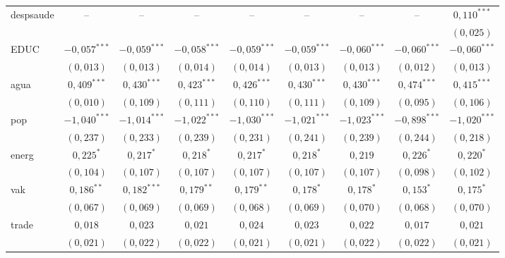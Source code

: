 \documentclass[
  12pt,
  a4paper,
  oneside,
  brazil,
  chapter=TITLE,
  section=TITLE
]{abntex2}
\begin{document}
\begin{table}[H]
\begin{tabular}{lcccccccc}
    despsaude
      & -- & -- & -- & -- & -- & -- & -- & $0{,}110^{***}$ \\
      &    &    &    &    &    &    &    & $(0{,}025)$ \\[3pt]
    \midrule
    EDUC
      & $-0{,}057^{***}$ & $-0{,}059^{***}$ & $-0{,}058^{***}$ & $-0{,}059^{***}$ & $-0{,}059^{***}$ & $-0{,}060^{***}$ & $-0{,}060^{***}$ & $-0{,}060^{***}$ \\
      & $(0{,}013)$ & $(0{,}013)$ & $(0{,}014)$ & $(0{,}014)$ & $(0{,}013)$ & $(0{,}013)$ & $(0{,}012)$ & $(0{,}013)$ \\[3pt]
    agua
      & $0{,}409^{***}$ & $0{,}430^{***}$ & $0{,}423^{***}$ & $0{,}426^{***}$ & $0{,}430^{***}$ & $0{,}430^{***}$ & $0{,}474^{***}$ & $0{,}415^{***}$ \\
      & $(0{,}010)$ & $(0{,}109)$ & $(0{,}111)$ & $(0{,}110)$ & $(0{,}111)$ & $(0{,}109)$ & $(0{,}095)$ & $(0{,}106)$ \\[3pt]
    pop
      & $-1{,}040^{***}$ & $-1{,}014^{***}$ & $-1{,}022^{***}$ & $-1{,}030^{***}$ & $-1{,}021^{***}$ & $-1{,}023^{***}$ & $-0{,}898^{***}$ & $-1{,}020^{***}$ \\
      & $(0{,}237)$ & $(0{,}233)$ & $(0{,}239)$ & $(0{,}231)$ & $(0{,}241)$ & $(0{,}239)$ & $(0{,}244)$ & $(0{,}218)$ \\[3pt]
    energ
      & $0{,}225^{*}$ & $0{,}217^{*}$ & $0{,}218^{*}$ & $0{,}217^{*}$ & $0{,}218^{*}$ & $0{,}219$ & $0{,}226^{*}$ & $0{,}220^{*}$ \\
      & $(0{,}104)$ & $(0{,}107)$ & $(0{,}107)$ & $(0{,}107)$ & $(0{,}107)$ & $(0{,}107)$ & $(0{,}098)$ & $(0{,}102)$ \\[3pt]
    vak
      & $0{,}186^{**}$ & $0{,}182^{***}$ & $0{,}179^{**}$ & $0{,}179^{**}$ & $0{,}178^{*}$ & $0{,}178^{*}$ & $0{,}153^{*}$ & $0{,}175^{*}$ \\
      & $(0{,}067)$ & $(0{,}069)$ & $(0{,}069)$ & $(0{,}068)$ & $(0{,}069)$ & $(0{,}070)$ & $(0{,}068)$ & $(0{,}070)$ \\[3pt]
    trade
      & $0{,}018$ & $0{,}023$ & $0{,}021$ & $0{,}024$ & $0{,}023$ & $0{,}022$ & $0{,}017$ & $0{,}021$ \\
      & $(0{,}021)$ & $(0{,}022)$ & $(0{,}022)$ & $(0{,}021)$ & $(0{,}021)$ & $(0{,}022)$ & $(0{,}022)$ & $(0{,}021)$ \\
    \bottomrule
  \end{tabular}
\end{table}
\end{document}
